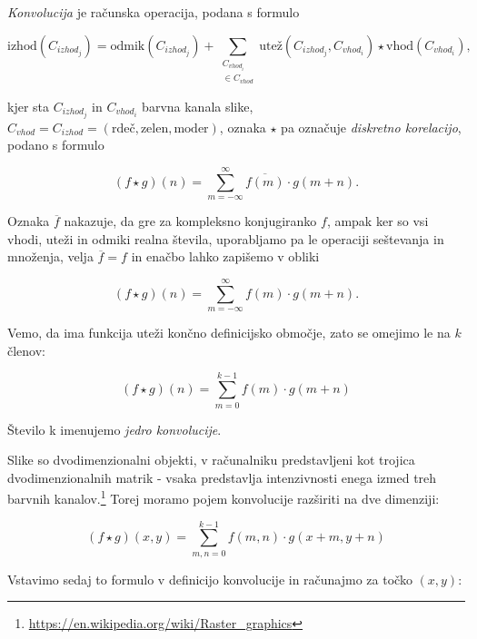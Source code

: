 \documentclass[a4paper,11pt]{article}
\begin{document}
\emph{Konvolucija} \cite{torch_conv2d} je računska operacija, podana s formulo

\begin{equation*}
\text{izhod}(C_{izhod_j}) =
	\text{odmik}(C_{izhod_j}) + \sum_{\substack{C_{vhod_i} \\ \in C_{vhod}}} \text{utež}(C_{izhod_j}, C_{vhod_i}) \star \text{vhod}(C_{vhod_i}) \text{,}
\end{equation*}

kjer sta $C_{izhod_j}$ in $C_{vhod_i}$ barvna kanala slike, $C_{vhod} = C_{izhod} = (\text{rdeč}, \text{zelen}, \text{moder})$,
	oznaka $\star$ pa označuje \emph{diskretno korelacijo}, podano s formulo

\begin{equation*}
(f\star g) (n) = \sum_{m = - \infty}^{\infty} \overline{f(m)} \cdot g(m + n) \text{.}
\end{equation*}

Oznaka $\overline{f}$ nakazuje, da gre za kompleksno konjugiranko $f$, ampak ker so vsi vhodi, uteži in odmiki realna števila,
	uporabljamo pa le operaciji seštevanja in množenja, velja $\overline{f} = f$ in enačbo lahko zapišemo v obliki

\begin{equation*}
(f\star g) (n) = \sum_{m = - \infty}^{\infty} f(m) \cdot g(m + n) \text{.}
\end{equation*}

Vemo, da ima funkcija uteži končno definicijsko območje, zato se omejimo le na $k$ členov:

\begin{equation*}
(f\star g) (n) = \sum_{m = 0}^{k - 1} f(m) \cdot g(m + n)
\end{equation*}

Število k imenujemo \emph{jedro konvolucije}.

Slike so dvodimenzionalni objekti, v računalniku predstavljeni kot trojica dvodimenzionalnih matrik - vsaka predstavlja intenzivnosti
	enega izmed treh barvnih kanalov.\footnote{\url{https://en.wikipedia.org/wiki/Raster\_graphics}}
Torej moramo pojem konvolucije razširiti na dve dimenziji:

\begin{equation*}
(f\star g) (x, y) = \sum_{m, n = 0}^{k - 1} f(m, n) \cdot g(x + m, y + n)
\end{equation*}

Vstavimo sedaj to formulo v definicijo konvolucije in računajmo za točko $(x, y)$:
\end{document}
